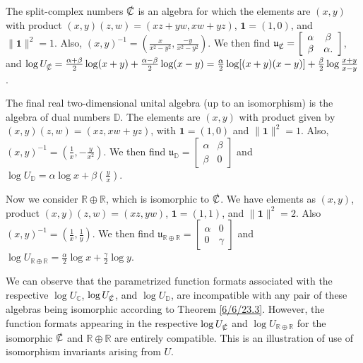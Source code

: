 \documentclass{amsart}
\numberwithin{equation}{section}
\theoremstyle{definition}
\numberwithin{theorem}{section}
\begin{document}
The split-complex numbers $\slashed{\mathbb{C}}$ is an algebra for which the elements are  $(x,y)$ with product $(x,y)(z,w) = (xz+yw,xw+yz)$, $ \mathbf{1} = (1,0)$, and $\|\mathbf{1}\|^2 = 1$.  Also, $(x,y)^{-1} = (\frac{x}{x^2-y^2},\frac{-y}{x^2-y^2})$.  We then find $\mathfrak{u}_{\slashed{\mathbb{C}}} = \left[\begin{array}{ccc}
 \alpha & \beta   \\ 
 \beta & \alpha.    
\end{array}\right]$, and $\log  U_{\slashed{\mathbb{C}}} = \frac{\alpha+\beta}{2}\log(x+y) + \frac{\alpha-\beta}{2}\log(x-y) = \frac{\alpha}{2}\log[(x+
y)(x-y)] +  \frac{\beta}{2}\log \frac{x+y}{x-y}$.

The final real two-dimensional unital algebra (up to an isomorphism) is the algebra of dual numbers $\mathbb{D}$.  The elements are $(x,y)$ with product given by $(x,y)(z,w) = (xz,xw+yz)$, with $\mathbf{1}=(1,0)$ and $\|\mathbf{1}\|^2 = 1$. Also, $(x,y)^{-1} = (\frac{1}{x},-\frac{y}{x^2})$.  We then find $\mathfrak{u}_\mathbb{D} = \left[\begin{array}{ccc}
 \alpha & \beta   \\ 
 \beta & 0    
\end{array}\right]$ and $\log  U_{\mathbb{D}} = \alpha\log x + \beta\left(\frac{y}{x}\right)$.

Now we consider $\mathbb{R}\oplus\mathbb{R}$, which is isomorphic to $\slashed{\mathbb{C}}$.  We have elements as $(x,y)$, product $(x,y)(z,w) = (xz,yw)$, $\mathbf{1}=(1,1)$, and $\|\mathbf{1}\|^2 = 2$.  Also $(x,y)^{-1} = (\frac{1}{x},\frac{1}{y})$.  We then find $\mathfrak{u}_{\mathbb{R}\oplus\mathbb{R}} = \left[\begin{array}{ccc}
 \alpha & 0   \\ 
 0 & \gamma    
\end{array}\right]$ and $\log  U_{\mathbb{R}\oplus\mathbb{R}} = \frac{\alpha}{2}\log x + \frac{\gamma}{2}\log y$.

We can observe that the parametrized function formats associated with the respective $\log U_{\mathbb{C}}$, $\log U_{\slashed{\mathbb{C}}}$, and $\log U_{\mathbb{D}}$, are incompatible with any pair of these algebras being isomorphic according to Theorem \ref{6/6/23.3}.  However, the function formats appearing in the respective $\log U_{\slashed{\mathbb{C}}}$ and $\log U_{\mathbb{R}\oplus\mathbb{R}}$  for the isomorphic $\slashed{\mathbb{C}}$ and $\mathbb{R}\oplus\mathbb{R}$ are entirely compatible.  This is an illustration of use of isomorphism invariants arising from $U$.
\end{document}
